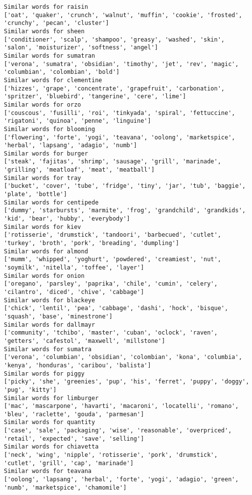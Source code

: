 \documentclass[11pt]{article}
\begin{document}
\begin{Verbatim}[commandchars=\\\{\}]
Similar words for raisin
['oat', 'quaker', 'crunch', 'walnut', 'muffin', 'cookie', 'frosted', 'crunchy', 'pecan', 'cluster']
Similar words for sheen
['conditioner', 'scalp', 'shampoo', 'greasy', 'washed', 'skin', 'salon', 'moisturizer', 'softness', 'angel']
Similar words for sumatran
['verona', 'sumatra', 'obsidian', 'timothy', 'jet', 'rev', 'magic', 'columbian', 'colombian', 'bold']
Similar words for clementine
['hizzes', 'grape', 'concentrate', 'grapefruit', 'carbonation', 'spritzer', 'bluebird', 'tangerine', 'cere', 'lime']
Similar words for orzo
['couscous', 'fusilli', 'roi', 'tinkyada', 'spiral', 'fettuccine', 'rigatoni', 'quinoa', 'penne', 'linguine']
Similar words for blooming
['flowering', 'forte', 'yogi', 'teavana', 'oolong', 'marketspice', 'herbal', 'lapsang', 'adagio', 'numb']
Similar words for burger
['steak', 'fajitas', 'shrimp', 'sausage', 'grill', 'marinade', 'grilling', 'meatloaf', 'meat', 'meatball']
Similar words for tray
['bucket', 'cover', 'tube', 'fridge', 'tiny', 'jar', 'tub', 'baggie', 'plate', 'bottle']
Similar words for centipede
['dummy', 'starbursts', 'marmite', 'frog', 'grandchild', 'grandkids', 'kid', 'bear', 'hubby', 'everybody']
Similar words for kiev
['rotisserie', 'drumstick', 'tandoori', 'barbecued', 'cutlet', 'turkey', 'broth', 'pork', 'breading', 'dumpling']
Similar words for almond
['mumm', 'whipped', 'yoghurt', 'powdered', 'creamiest', 'nut', 'soymilk', 'nitella', 'toffee', 'layer']
Similar words for onion
['oregano', 'parsley', 'paprika', 'chile', 'cumin', 'celery', 'cilantro', 'diced', 'chive', 'cabbage']
Similar words for blackeye
['chick', 'lentil', 'pea', 'cabbage', 'dashi', 'hock', 'bisque', 'squash', 'base', 'minestrone']
Similar words for dallmayr
['community', 'tchibo', 'master', 'cuban', 'oclock', 'raven', 'getters', 'cafestol', 'maxwell', 'millstone']
Similar words for sumatra
['verona', 'columbian', 'obsidian', 'colombian', 'kona', 'columbia', 'kenya', 'honduras', 'caribou', 'balista']
Similar words for piggy
['picky', 'she', 'greenies', 'pup', 'his', 'ferret', 'puppy', 'doggy', 'pug', 'kitty']
Similar words for limburger
['mac', 'mascarpone', 'havarti', 'macaroni', 'locatelli', 'romano', 'bleu', 'raclette', 'gouda', 'parmesan']
Similar words for quantity
['case', 'sale', 'packaging', 'wise', 'reasonable', 'overpriced', 'retail', 'expected', 'save', 'selling']
Similar words for chiavetta
['neck', 'wing', 'nipple', 'rotisserie', 'pork', 'drumstick', 'cutlet', 'grill', 'cap', 'marinade']
Similar words for teavana
['oolong', 'lapsang', 'herbal', 'forte', 'yogi', 'adagio', 'green', 'numb', 'marketspice', 'chamomile']

\end{Verbatim}
\end{document}
